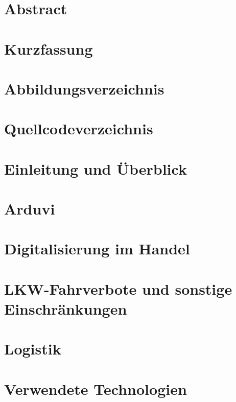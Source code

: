 \documentclass[12pt]{report}
\begin{document}
    \chapter*{Abstract}
        

    \chapter*{Kurzfassung}
        

    \tableofcontents

    \chapter*{Abbildungsverzeichnis}
        

    \chapter*{Quellcodeverzeichnis}
        


    \chapter{Einleitung und Überblick}
        

    \chapter{Arduvi}
        

    \chapter{Digitalisierung im Handel}
        

    \chapter{LKW-Fahrverbote und sonstige Einschränkungen}
        

    \chapter{Logistik}
        

    \chapter{Verwendete Technologien}
        
\end{document}
